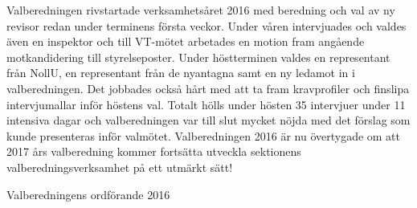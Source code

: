 \documentclass[../_main/handlingar.tex]{subfiles}
\begin{document}
Valberedningen rivstartade verksamhetsåret 2016 med beredning och val av ny revisor redan under terminens första veckor. Under våren intervjuades och valdes även en inspektor och till VT-mötet arbetades en motion fram angående motkandidering till styrelseposter. Under höstterminen valdes en representant från NollU, en representant från de nyantagna samt en ny ledamot in i valberedningen. Det jobbades också hårt med att ta fram kravprofiler och finslipa intervjumallar inför höstens val. Totalt hölls under hösten 35 intervjuer under 11 intensiva dagar och valberedningen var till slut mycket nöjda med det förslag som kunde presenteras inför valmötet.  Valberedningen 2016 är nu övertygade om att 2017 års valberedning kommer fortsätta utveckla sektionens valberedningsverksamhet på ett utmärkt sätt!


\begin{signatures}{1}
    \mvh
    \signature{Elin Magnusson}{Valberedningens ordförande 2016}
\end{signatures}
\end{document}
